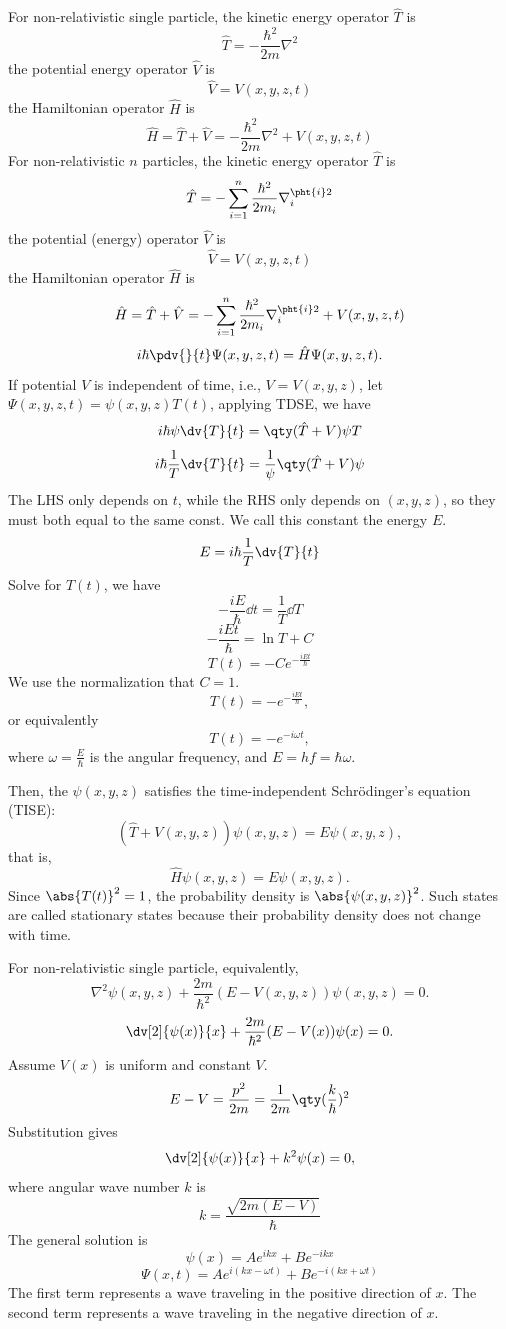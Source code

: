\documentclass[a4paper,12pt]{article}
\begin{document}
For non-relativistic single particle, the kinetic energy operator $\hat{T}$ is
\[\hat{T}=-\frac{\hbar^2}{2m}\nabla^2\]
the potential energy operator $\hat{V}$ is
\[\hat{V}=V(x,y,z,t)\]
the Hamiltonian operator $\hat{H}$ is
\[\hat{H}=\hat{T}+\hat{V}=-\frac{\hbar^2}{2m}\nabla^2+V(x,y,z,t)\]
For non-relativistic $n$ particles, the kinetic energy operator $\hat{T}$ is
\[\hat{T}=-\sum_{i=1}^n\frac{\hbar^2}{2m_i}\nabla_i^{\pht{i}2}\]
the potential (energy) operator $\hat{V}$ is
\[\hat{V}=V(x,y,z,t)\]
the Hamiltonian operator $\hat{H}$ is
\[\hat{H}=\hat{T}+\hat{V}=-\sum_{i=1}^n\frac{\hbar^2}{2m_i}\nabla_i^{\pht{i}2}+V(x,y,z,t)\]
\[i\hbar\pdv{}{t}\Psi(x,y,z,t)=\hat{H}\Psi(x,y,z,t).\]
If potential $V$ is independent of time, i.e., $V=V(x,y,z)$, let $\Psi(x,y,z,t)=\psi(x,y,z)T(t)$, applying TDSE, we have
\[i\hbar\psi\dv{T}{t}=\qty(\hat{T}+V)\psi T\]
\[i\hbar\frac{1}{T}\dv{T}{t}=\frac{1}{\psi}\qty(\hat{T}+V)\psi\]
The LHS only depends on $t$, while the RHS only depends on $(x,y,z)$, so they must both equal to the same const. We call this constant the energy $E$.
\[E=i\hbar\frac{1}{T}\dv{T}{t}\]
Solve for $T(t)$, we have
\[-\frac{iE}{\hbar}\dd{t}=\frac{1}{T}\dd{T}\]
\[-\frac{iEt}{\hbar}=\ln T+C\]
\[T(t)=-Ce^{-\frac{iEt}{\hbar}}\]
We use the normalization that $C=1$.
\[T(t)=-e^{-\frac{iEt}{\hbar}},\]
or equivalently
\[T(t)=-e^{-i\omega t},\]
where $\omega=\frac{E}{\hbar}$ is the angular frequency, and $E=hf=\hbar\omega$.

Then, the $\psi(x,y,z)$ satisfies the time-independent Schrödinger's equation (TISE):
\[(\hat{T}+V(x,y,z))\psi(x,y,z)=E\psi(x,y,z),\]
that is,
\[\hat{H}\psi(x,y,z)=E\psi(x,y,z).\]
Since $\abs{T(t)}^2=1$, the probability density is $\abs{\psi(x,y,z)}^2$. Such states are called stationary states because their probability density does not change with time.

For non-relativistic single particle, equivalently,
\[\nabla^2\psi(x,y,z)+\frac{2m}{\hbar^2}(E-V(x,y,z))\psi(x,y,z)=0.\]
\[\dv[2]{\psi(x)}{x}+\frac{2m}{\hbar^2}(E-V(x))\psi(x)=0.\]
Assume $V(x)$ is uniform and constant $V$.
\[E-V=\frac{p^2}{2m}=\frac{1}{2m}\qty(\frac{k}{\hbar})^2\]
Substitution gives
\[\dv[2]{\psi(x)}{x}+k^2\psi(x)=0,\]
where angular wave number $k$ is
\[k=\frac{\sqrt{2m(E-V)}}{\hbar}\]
The general solution is
\[\psi(x)=Ae^{ikx}+Be^{-ikx}\]
\[\Psi(x,t)=Ae^{i(kx-\omega t)}+Be^{-i(kx+\omega t)}\]
The first term represents a wave traveling in the positive direction of $x$. The second term represents a wave traveling in the negative direction of $x$.
\end{document}

